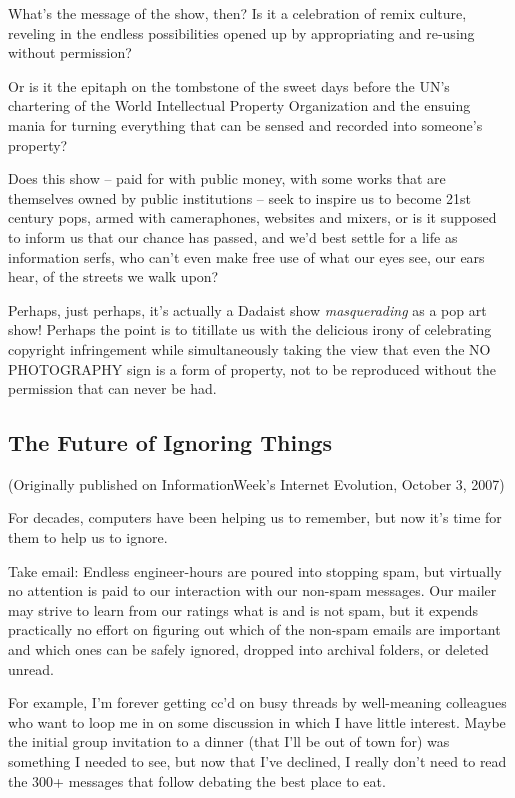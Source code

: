 What's the message of the show, then? Is it a celebration of remix
culture, reveling in the endless possibilities opened up by
appropriating and re-using without permission?

Or is it the epitaph on the tombstone of the sweet days before the
UN's chartering of the World Intellectual Property Organization and
the ensuing mania for turning everything that can be sensed and
recorded into someone's property?

Does this show -- paid for with public money, with some works that
are themselves owned by public institutions -- seek to inspire us
to become 21st century pops, armed with cameraphones, websites and
mixers, or is it supposed to inform us that our chance has passed,
and we'd best settle for a life as information serfs, who can't
even make free use of what our eyes see, our ears hear, of the
streets we walk upon?

Perhaps, just perhaps, it's actually a Dadaist show
\emph{masquerading} as a pop art show! Perhaps the point is to
titillate us with the delicious irony of celebrating copyright
infringement while simultaneously taking the view that even the NO
PHOTOGRAPHY sign is a form of property, not to be reproduced
without the permission that can never be had.

\subsection{The Future of Ignoring Things}

(Originally published on InformationWeek's Internet Evolution,
October 3, 2007)

For decades, computers have been helping us to remember, but now
it's time for them to help us to ignore.

Take email: Endless engineer-hours are poured into stopping spam,
but virtually no attention is paid to our interaction with our
non-spam messages. Our mailer may strive to learn from our ratings
what is and is not spam, but it expends practically no effort on
figuring out which of the non-spam emails are important and which
ones can be safely ignored, dropped into archival folders, or
deleted unread.

For example, I'm forever getting cc'd on busy threads by
well-meaning colleagues who want to loop me in on some discussion
in which I have little interest. Maybe the initial group invitation
to a dinner (that I'll be out of town for) was something I needed
to see, but now that I've declined, I really don't need to read the
300+ messages that follow debating the best place to eat.

